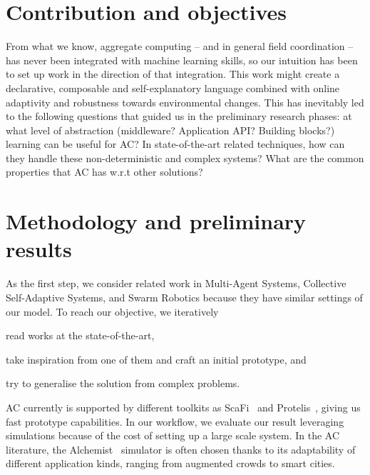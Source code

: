 \documentclass[conference]{IEEEtran}
\begin{document}
\section{Contribution and objectives}
From what we know, aggregate computing -- and in general field coordination -- has never been integrated with machine learning skills, so our intuition has been to set up work in the direction of that integration.
%
This work might create a declarative, composable and self-explanatory language combined with online adaptivity and robustness towards environmental changes.
%
This has inevitably led to the following questions that guided us in the preliminary research phases: 
at what level of abstraction (middleware? Application API? Building blocks?) learning can be useful for AC?
%
In state-of-the-art related techniques, how can they handle these non-deterministic and complex systems?
%
What are the common properties that AC has w.r.t other solutions?
\section{Methodology and preliminary results}
%
As the first step, we consider related work in Multi-Agent Systems, Collective Self-Adaptive Systems, and Swarm Robotics because they have similar settings of our model.
To reach our objective, we iteratively 
\begin{enumerate*}[label=(\roman*)]
\item read works at the state-of-the-art,
\item take inspiration from one of them and craft an initial prototype, and
\item try to generalise the solution from complex problems.
\end{enumerate*}
AC currently is supported by different toolkits as ScaFi~\cite{DBLP:conf/ecoop/CasadeiV16} and Protelis~\cite{DBLP:conf/sac/PianiniVB15}, giving us fast prototype capabilities.
%
In our workflow, we evaluate our result leveraging simulations because of the cost of setting up a large scale system.
%
In the AC literature, the Alchemist~\cite{alchemist-jos2013} simulator is often chosen thanks to its adaptability of different application kinds, ranging from augmented crowds to smart cities.
\end{document}
